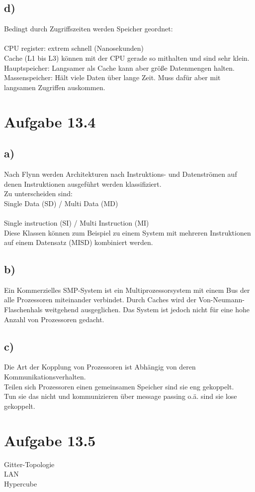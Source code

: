 \documentclass{article}
\begin{document}
	\subsection*{d)}
	Bedingt durch Zugriffszeiten werden Speicher geordnet: \\ \\
	CPU register: extrem schnell (Nanosekunden) \\
	Cache (L1 bis L3) können mit der CPU gerade so mithalten und sind sehr klein. \\
	Hauptspeicher: Langsamer als Cache kann aber größe Datenmengen halten. \\
	Massenspeicher: Hält viele Daten über lange Zeit. Muss dafür aber mit langsamen Zugriffen auskommen.
	\section*{Aufgabe 13.4}
	\subsection*{a)}
	Nach Flynn werden Architekturen nach Instruktions- und Datenströmen auf denen Instruktionen ausgeführt werden klassifiziert. \\
	Zu unterscheiden sind: \\
	Single Data (SD) / Multi Data (MD) \\ \\
	Single instruction (SI) / Multi Instruction (MI) \\
	Diese Klassen können zum Beispiel zu einem System mit mehreren Instruktionen auf einem Datensatz (MISD) kombiniert werden.
	\subsection*{b)}
	Ein Kommerzielles SMP-System ist ein Multiprozessorsystem mit einem Bus der alle Prozessoren miteinander verbindet. Durch Caches wird der Von-Neumann-Flaschenhals weitgehend ausgeglichen. Das System ist jedoch nicht für eine hohe Anzahl von Prozessoren gedacht.
	\subsection*{c)}
	Die Art der Kopplung von Prozessoren ist Abhängig von deren Kommunikationsverhalten. \\
	Teilen sich Prozessoren einen gemeinsamen Speicher sind sie eng gekoppelt. \\
	Tun sie das nicht und kommunizieren über message passing o.ä. sind sie lose gekoppelt. 
	\section*{Aufgabe 13.5}
	Gitter-Topologie \\
	LAN \\
	Hypercube
\end{document}
